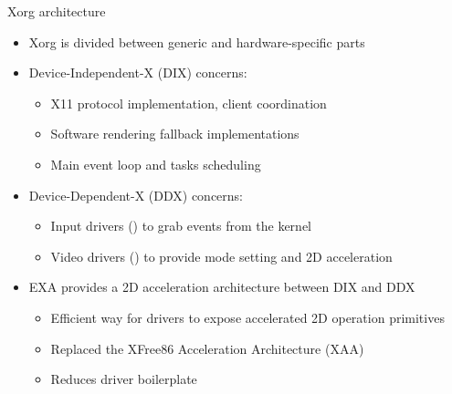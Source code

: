 \begin{frame}{Xorg architecture}
  \begin{itemize}
  \item Xorg is divided between generic and hardware-specific parts
  \item Device-Independent-X (DIX) concerns:
    \begin{itemize}
    \item X11 protocol implementation, client coordination
    \item Software rendering fallback implementations
    \item Main event loop and tasks scheduling
    \end{itemize}
  \item Device-Dependent-X (DDX) concerns:
    \begin{itemize}
    \item Input drivers () to grab events from the kernel
    \item Video drivers () to provide mode setting and 2D acceleration
    \end{itemize}
  \item EXA provides a 2D acceleration architecture between DIX and DDX
    \begin{itemize}
    \item Efficient way for drivers to expose accelerated 2D operation primitives
    \item Replaced the XFree86 Acceleration Architecture (XAA)
    \item Reduces driver boilerplate
    \end{itemize}
  \end{itemize}
\end{frame}

